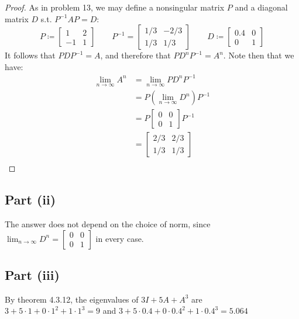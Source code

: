 \documentclass{article}
\begin{document}
\begin{proof}
As in problem 13, we may define a nonsingular matrix $P$ and a diagonal matrix $D$ s.t. $P^{-1}AP = D$:
$$P \coloneqq \begin{bmatrix} 1 & 2 \\ -1 & 1\end{bmatrix} \qquad P^{-1} = \begin{bmatrix} 1/3 & -2 / 3 \\ 1 / 3 & 1 / 3\end{bmatrix} \qquad D \coloneqq \begin{bmatrix} 0.4 & 0 \\ 0 & 1 \end{bmatrix}$$
It follows that $PDP^{-1} = A$, and therefore that $PD^nP^{-1} = A^n$. Note then that we have:
\begin{align*}
\lim_{n \to \infty} A^n &= \lim_{n \to \infty} PD^nP^{-1} \\
&= P(\lim_{n \to \infty}D^n)P^{-1} \\
&= P\begin{bmatrix} 0 & 0 \\ 0 & 1 \end{bmatrix}P^{-1} \\
&= \begin{bmatrix} 2 / 3 & 2 / 3 \\ 1 / 3 & 1 / 3\end{bmatrix} \\
\end{align*}
\end{proof}

\subsection*{Part (ii)}

The answer does not depend on the choice of norm, since $\lim_{n \to \infty}D^n = \begin{bmatrix} 0 & 0 \\ 0 & 1 \end{bmatrix}$ in every case.

\subsection*{Part (iii)}

By theorem 4.3.12, the eigenvalues of $3I + 5A + A^3$ are $3 + 5 \cdot 1 + 0 \cdot 1^2 + 1 \cdot 1^3 = 9$ and $3 + 5 \cdot 0.4 + 0 \cdot 0.4^2 + 1 \cdot 0.4^3 = 5.064$
\end{document}
